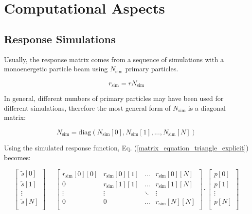 \documentclass{article}
\begin{document}
\section{Computational Aspects}

\subsection{Response Simulations}
\label{sec:response_simulations}

Usually, the response matrix comes from a sequence of simulations with a monoenergetic particle beam using $N_\mathrm{sim}$ primary particles.

\begin{equation}
	\label{response_matrix_normalization}
	r_\mathrm{sim} = r N_\mathrm{sim}
\end{equation}

\noindent In general, different numbers of primary particles may have been used for different simulations, therefore the most general form of $N_\mathrm{sim}$ is a diagonal matrix:

\begin{equation}
	N_\mathrm{sim} = \mathrm{diag}\left( N_\mathrm{sim} [0], N_\mathrm{sim} [1], ..., N_\mathrm{sim} [N] \right)
\end{equation}

\noindent Using the simulated response function, Eq. (\ref{matrix_equation_triangle_explicit}) becomes:

\begin{equation}
	\label{matrix_equation_triangle_simulated}
	\left[ 
		\begin{array}{c}
			\tilde{s}[0] \\
			\tilde{s}[1] \\
			\vdots	\\
			\tilde{s}[N] \\
		\end{array}
	\right]
	= 
	\begin{bmatrix}
		r_\mathrm{sim}[0][0] & r_\mathrm{sim}[0][1] & \hdots & r_\mathrm{sim}[0][N] \\
		0       & r_\mathrm{sim}[1][1] & \hdots & r_\mathrm{sim}[1][N] \\
		\vdots  & \vdots  & \ddots & \vdots  \\
		0       & 0       & \hdots & r_\mathrm{sim}[N][N] \\
	\end{bmatrix}
	\cdot
	\left[ 
		\begin{array}{c}
			p[0] \\
			p[1] \\
			\vdots	\\
			p[N] \\
		\end{array}
	\right]
\end{equation}
\end{document}

